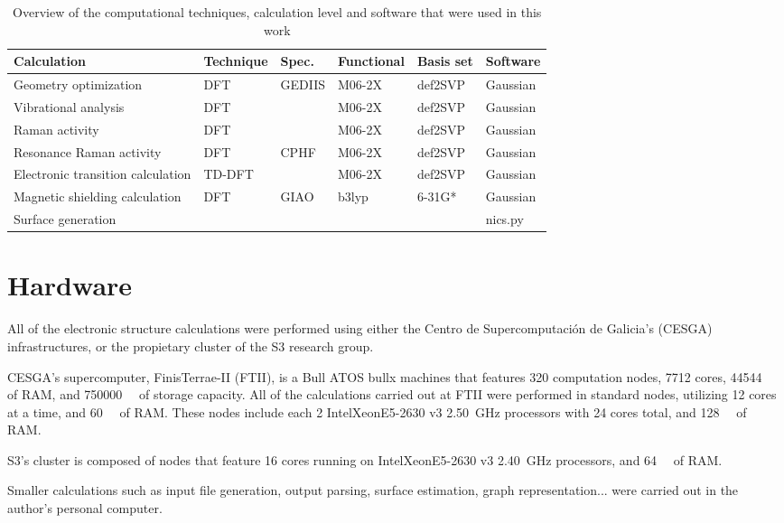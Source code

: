 \begin{table*}[h]
    \centering
    \caption[Overview of techniques, level and software]{Overview of the computational techniques, calculation level and software that were used in this work}
    \begin{tabular}{@{}llllll@{}}
        \toprule
        Calculation & Technique & Spec. & Functional & Basis set & Software \\
        \midrule
        Geometry optimization                   & DFT       & GEDIIS    & M06-2X & def2SVP & Gaussian \\
        Vibrational analysis                    & DFT       &           & M06-2X & def2SVP & Gaussian \\
        Raman activity                          & DFT       &           & M06-2X & def2SVP & Gaussian \\
        Resonance Raman activity                & DFT       & CPHF      & M06-2X & def2SVP & Gaussian \\
        Electronic transition calculation       & TD-DFT    &           & M06-2X & def2SVP & Gaussian \\
        Magnetic shielding calculation          & DFT       & GIAO      & b3lyp  & 6-31G*  & Gaussian \\
        Surface generation                      &           &           & & & nics.py \\
        \bottomrule
    \end{tabular}
\end{table*}


\section{Hardware}
All of the electronic structure calculations were performed using either the Centro de Supercomputación de Galicia's (CESGA) infrastructures, or the propietary cluster of the S3 research group.

CESGA's supercomputer, FinisTerrae-II (FTII), is a Bull ATOS bullx machines that features \num{320} computation nodes, \num{7712} cores, \SI{44544}{\giga\byte} of RAM, and \SI{750000}{\giga\byte} of storage capacity.
All of the calculations carried out at FTII were performed in standard nodes, utilizing \num{12} cores at a time, and \SI{60}{\giga\byte} of RAM.
These nodes include each 2 Intel\textregistered Xeon\textregistered E5-2630 v3 \SI{2.50}{\giga\hertz} processors with \num{24} cores total, and \SI{128}{\giga\byte} of RAM.

S3's cluster is composed of nodes that feature \num{16} cores running on Intel\textregistered Xeon\textregistered E5-2630 v3 \SI{2.40}{\giga\hertz} processors, and \SI{64}{\giga\byte} of RAM.

Smaller calculations such as input file generation, output parsing, surface estimation, graph representation... were carried out in the author's personal computer.

